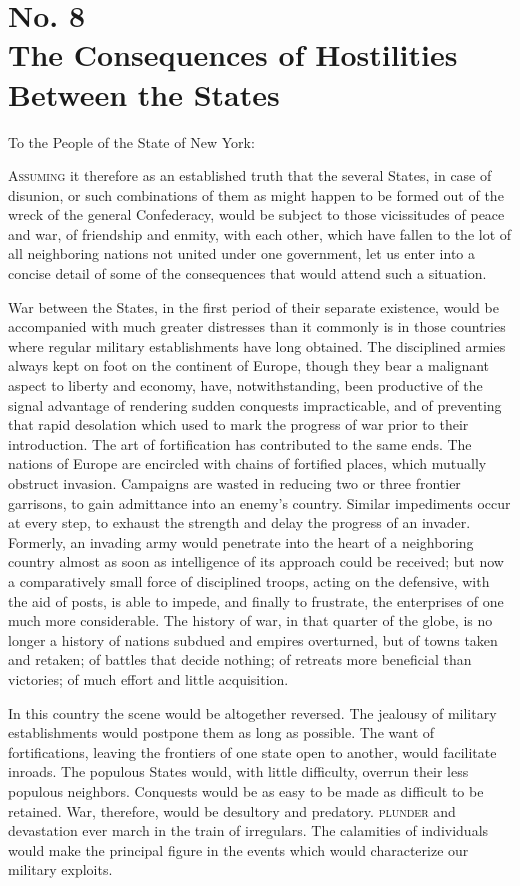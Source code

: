 \chapter[No. 8: The Consequences of Hostilities Between the States]{No. 8\\ {\small The Consequences of Hostilities Between the States}}
To the People of the State of New York:
\vspace{.4cm}

\textsc{Assuming }it therefore as an established truth that the several States, in case of disunion, or such combinations of them as might happen to be formed out of the wreck of the general Confederacy, would be subject to those vicissitudes of peace and war, of friendship and enmity, with each other, which have fallen to the lot of all neighboring nations not united under one government, let us enter into a concise detail of some of the consequences that would attend such a situation.

War between the States, in the first period of their separate existence, would be accompanied with much greater distresses than it commonly is in those countries where regular military establishments have long obtained. The disciplined armies always kept on foot on the continent of Europe, though they bear a malignant aspect to liberty and economy, have, notwithstanding, been productive of the signal advantage of rendering sudden conquests impracticable, and of preventing that rapid desolation which used to mark the progress of war prior to their introduction. The art of fortification has contributed to the same ends. The nations of Europe are encircled with chains of fortified places, which mutually obstruct invasion. Campaigns are wasted in reducing two or three frontier garrisons, to gain admittance into an enemy's country. Similar impediments occur at every step, to exhaust the strength and delay the progress of an invader. Formerly, an invading army would penetrate into the heart of a neighboring country almost as soon as intelligence of its approach could be received; but now a comparatively small force of disciplined troops, acting on the defensive, with the aid of posts, is able to impede, and finally to frustrate, the enterprises of one much more considerable. The history of war, in that quarter of the globe, is no longer a history of nations subdued and empires overturned, but of towns taken and retaken; of battles that decide nothing; of retreats more beneficial than victories; of much effort and little acquisition.

In this country the scene would be altogether reversed. The jealousy of military establishments would postpone them as long as possible. The want of fortifications, leaving the frontiers of one state open to another, would facilitate inroads. The populous States would, with little difficulty, overrun their less populous neighbors. Conquests would be as easy to be made as difficult to be retained. War, therefore, would be desultory and predatory. \textsc{plunder }and devastation ever march in the train of irregulars. The calamities of individuals would make the principal figure in the events which would characterize our military exploits.


